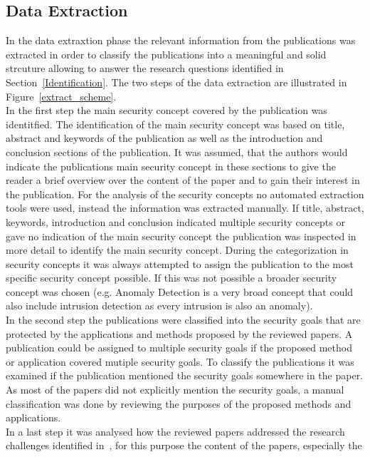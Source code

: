 \documentclass[runningheads]{llncs}
\begin{document}
\subsection{Data Extraction}\label{Extraction}
In the data extraxtion phase the relevant information from the publications was extracted in order to classify the publications into a meaningful and
solid strcuture allowing to answer the research questions identified in Section~\ref{Identification}. The two steps of the data extraction
are illustrated in Figure~\ref{extract_scheme}.\\
In the first step the main security concept covered by the publication was identitfied. The identification of the main security concept was based on
title, abstract and keywords of the publication as well as the introduction and conclusion sections of the publication. It was assumed, that the authors
would indicate the publications main security concept in these sections to give the reader a brief overview over the content of the paper and to gain their
interest in the publication. For the analysis of the security concepts no automated extraction tools were used, instead the information was extracted manually.
If title, abstract, keywords, introduction and conclusion indicated multiple security concepts or gave no indication of the main security concept the
publication was inspected in more detail to identify the main security concept. During the categorization in security concepts it was always attempted
to assign the publication to the most specific security concept possible. If this was not possible a broader security concept was chosen (e.g.
Anomaly Detection is a very broad concept that could also include intrusion detection as every intrusion is also an anomaly).\\
In the second step the publications were classified into the security goals that are protected by the applications and methods proposed by the reviewed papers.
A publication could be assigned to multiple security goals if the proposed method or application covered mutiple security goals. To classify the publications it was examined
if the publication mentioned the security goals somewhere in the paper. As most of the papers did not explicitly mention the security goals, a manual classification was done by reviewing
the purposes of the proposed methods and applications.\\
In a last step it was analysed how the reviewed papers addressed the research challenges identified in~\cite{Leitner2014273}, for this purpose the content of the papers, especially the
\end{document}

